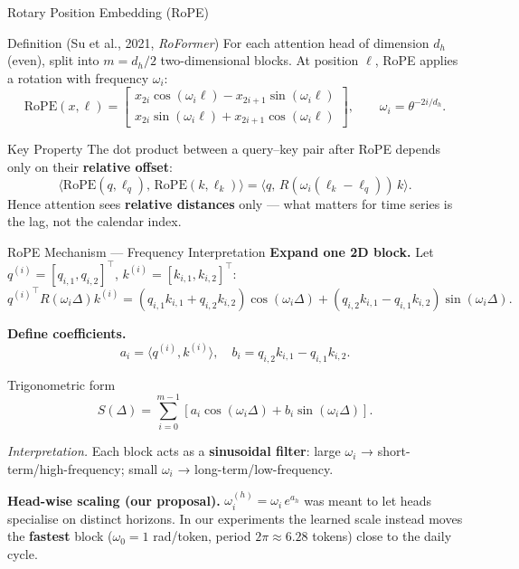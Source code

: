 \documentclass[aspectratio=169,xcolor=dvipsnames]{beamer}
\begin{document}
\begin{frame}{Rotary Position Embedding (RoPE)}
\small
\begin{block}{Definition (Su et al., 2021, \emph{RoFormer})}
For each attention head of dimension $d_h$ (even), split into $m=d_h/2$ two-dimensional blocks.
At position $\ell$, RoPE applies a rotation with frequency $\omega_i$:
\[
\mathrm{RoPE}(x,\ell)=
\begin{bmatrix}
x_{2i}\cos(\omega_i\ell)-x_{2i+1}\sin(\omega_i\ell) \\
x_{2i}\sin(\omega_i\ell)+x_{2i+1}\cos(\omega_i\ell)
\end{bmatrix},
\qquad
\omega_i=\theta^{-2i/d_h}.
\]
\end{block}

\begin{alertblock}{Key Property}
The dot product between a query–key pair after RoPE depends only on their \textbf{relative offset}:
\[
\langle \mathrm{RoPE}(q,\ell_q),\, \mathrm{RoPE}(k,\ell_k)\rangle
= \langle q,\, R(\omega_i(\ell_k-\ell_q))\,k\rangle.
\]
Hence attention sees \textbf{relative distances} only --- what matters for time series is the lag, not the calendar index.
\end{alertblock}
\end{frame}

\begin{frame}{RoPE Mechanism — Frequency Interpretation}
\footnotesize
\textbf{Expand one 2D block.}
Let $q^{(i)}=[q_{i,1},q_{i,2}]^\top$, $k^{(i)}=[k_{i,1},k_{i,2}]^\top$:
\[
{q^{(i)}}^\top R(\omega_i\Delta)k^{(i)}
=(q_{i,1}k_{i,1}+q_{i,2}k_{i,2})\cos(\omega_i\Delta)
+(q_{i,2}k_{i,1}-q_{i,1}k_{i,2})\sin(\omega_i\Delta).
\]

\textbf{Define coefficients.}
\[
a_i=\langle q^{(i)},k^{(i)}\rangle,\quad
b_i=q_{i,2}k_{i,1}-q_{i,1}k_{i,2}.
\]

\begin{block}{Trigonometric form}
\[
S(\Delta)=\sum_{i=0}^{m-1}[a_i\cos(\omega_i\Delta)+b_i\sin(\omega_i\Delta)].
\]
\end{block}

\textit{Interpretation.}
Each block acts as a \textbf{sinusoidal filter}:  
large $\omega_i$ → short-term/high-frequency;  
small $\omega_i$ → long-term/low-frequency.

\vspace{1mm}
\textbf{Head-wise scaling (our proposal).}
$\omega_i^{(h)}=\omega_i\,e^{a_h}$ was meant to let heads specialise on distinct horizons.
\alert{In our experiments the learned scale instead moves the \textbf{fastest} block ($\omega_0=1$ rad/token, period $2\pi\approx6.28$ tokens) close to the daily cycle.}
\end{frame}
\end{document}
